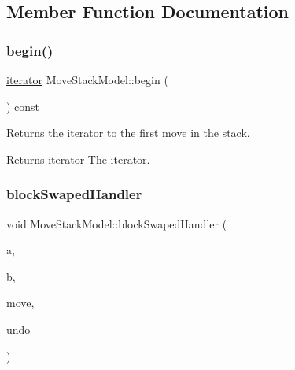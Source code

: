 \subsection{Member Function Documentation}
\mbox{\label{class_move_stack_model_a5617b792b9e541940f6bfdbcc3c08bfa}} 
\subsubsection{\texorpdfstring{begin()}{begin()}}
{\footnotesize\ttfamily \mbox{\hyperlink{class_move_stack_model_a64b3cd5b744e18ce4cebd87957b2f3fa}{iterator}} Move\+Stack\+Model\+::begin (\begin{DoxyParamCaption}{ }\end{DoxyParamCaption}) const\hspace{0.3cm}{\ttfamily [inline]}}



Returns the iterator to the first move in the stack. 

\begin{DoxyReturn}{Returns}
iterator The iterator. 
\end{DoxyReturn}
\mbox{\label{class_move_stack_model_a8ff4e26b9eaded33ae9a2588d470feaa}} 
\subsubsection{\texorpdfstring{blockSwapedHandler}{blockSwapedHandler}}
{\footnotesize\ttfamily void Move\+Stack\+Model\+::block\+Swaped\+Handler (\begin{DoxyParamCaption}\item[{\mbox{\hyperlink{class_block}{Block}}$<$ \mbox{\hyperlink{class_block_layout_item}{Block\+Layout\+Item}} $>$ \&}]{a,  }\item[{\mbox{\hyperlink{class_block}{Block}}$<$ \mbox{\hyperlink{class_block_layout_item}{Block\+Layout\+Item}} $>$ \&}]{b,  }\item[{const std\+::shared\+\_\+ptr$<$ \mbox{\hyperlink{struct_move}{Move}} $>$ \&}]{move,  }\item[{bool}]{undo }\end{DoxyParamCaption})\hspace{0.3cm}{\ttfamily [slot]}}



